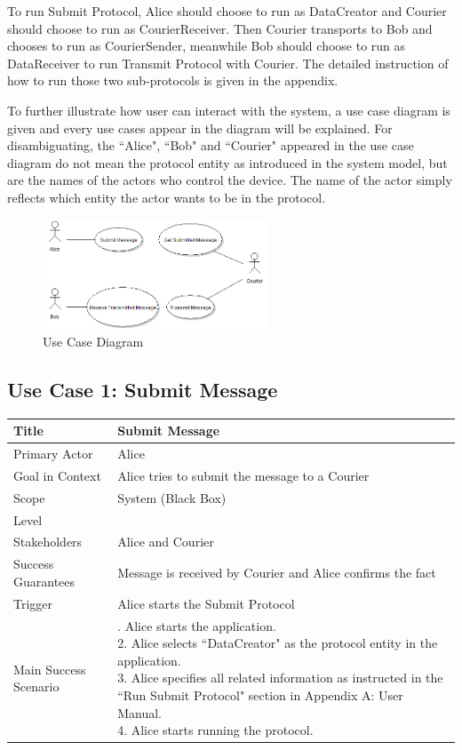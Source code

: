 To run Submit Protocol, Alice should choose to run as DataCreator and Courier should choose to run as CourierReceiver. Then Courier transports to Bob and chooses to run as CourierSender, meanwhile Bob should choose to run as DataReceiver to run Transmit Protocol with Courier. The detailed instruction of how to run those two sub-protocols is given in the appendix. \par

To further illustrate how user can interact with the system, a use case diagram is given and every use cases appear in the diagram will be explained. For disambiguating, the ``Alice", ``Bob" and ``Courier" appeared in the use case diagram do not mean the protocol entity as introduced in the system model, but are the names of the actors who control the device. The name of the actor simply reflects which entity the actor wants to be in the protocol. \\

\begin{figure}[h!]
\centering
\includegraphics[width=0.6\textwidth,natwidth=565,natheight=275]{figures/usecasediagram.png}
\caption{Use Case Diagram}
\end{figure}

\subsection*{Use Case 1: Submit Message}
\begin{tabular}{|l|p{}|}
 \hline
 Title & Submit Message \\ \hline
 Primary Actor & Alice \\ \hline
 Goal in Context & Alice tries to submit the message to a Courier \\ \hline
 Scope & System (Black Box) \\ \hline
 Level & \\ \hline
 Stakeholders & Alice and Courier \\ \hline
 Success Guarantees & Message is received by Courier and Alice confirms the fact \\ \hline
 Trigger & Alice starts the Submit Protocol \\ \hline
 Main Success Scenario & 
 \parbox{9cm}{
  . Alice starts the application. \\
  2. Alice selects ``DataCreator" as the protocol entity in the application. \\
  3. Alice specifies all related information as instructed in the ``Run Submit Protocol" section in Appendix A: User Manual. \\
  4. Alice starts running the protocol.
  \medskip
 }
 \\ \hline
\end{tabular}
\\
\\

